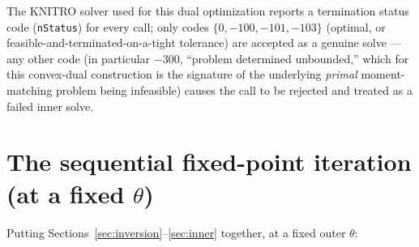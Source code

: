 \documentclass[11pt]{article}
\begin{document}
The KNITRO solver used for this dual optimization reports a termination status code (\texttt{nStatus})
for every call; only codes $\{0,-100,-101,-103\}$ (optimal, or feasible-and-terminated-on-a-tight
tolerance) are accepted as a genuine solve — any other code (in particular $-300$, ``problem
determined unbounded,'' which for this convex-dual construction is the signature of the underlying
\emph{primal} moment-matching problem being infeasible) causes the call to be rejected and treated
as a failed inner solve.

\section{The sequential fixed-point iteration (at a fixed $\theta$)}
\label{sec:sequential}

Putting Sections~\ref{sec:inversion}--\ref{sec:inner} together, at a fixed outer $\theta$:
\end{document}
